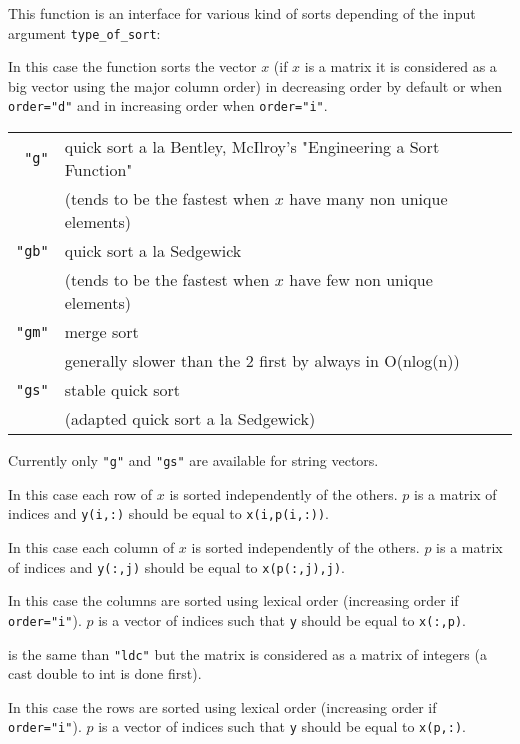 \begin{mandescription}
This function is an interface for various kind of sorts depending of
the input argument \verb+type_of_sort+:

In this case the function sorts the vector $x$ (if $x$ is a matrix
it is considered as a big vector using the major column order) in 
decreasing order by default or when \verb+order="d"+ and in increasing
order when \verb+order="i"+. 

\begin{tabular}{|r|l|}
\hline
\verb+"g"+  &  quick sort a la Bentley, McIlroy's "Engineering a Sort Function" \\
            &  (tends to be the fastest when $x$ have many non unique elements) \\ 
\hline
\verb+"gb"+  &  quick sort a la Sedgewick \\
            &  (tends to be the fastest when $x$ have few non unique elements) \\ 
\hline
\verb+"gm"+  &  merge sort \\
             &  generally slower than the 2 first by always in  O(nlog(n)) \\
\hline
\verb+"gs"+  &  stable quick sort \\
             &  (adapted quick sort a la Sedgewick)  \\ 
\hline
\end{tabular}

Currently only \verb+"g"+ and  \verb+"gs"+ are available for string vectors.

In this case each row of $x$ is sorted independently of the others.
$p$ is a matrix of indices and \verb+y(i,:)+ should be equal to
\verb+x(i,p(i,:))+. 

In this case each column of $x$ is sorted independently of the others.
$p$ is a matrix of indices and \verb+y(:,j)+ should be equal to
\verb+x(p(:,j),j)+. 

In this case the columns are sorted using lexical order (increasing 
order if \verb+order="i"+). $p$ is a vector of indices such that \verb+y+ should be equal to
\verb+x(:,p)+. 

is the same than \verb+"ldc"+ but the matrix is considered as a matrix
of integers (a cast double to int is done first).

In this case the rows are sorted using lexical order (increasing 
order if \verb+order="i"+). $p$ is a vector of indices such that \verb+y+ should be equal to
\verb+x(p,:)+. 


\end{mandescription}
